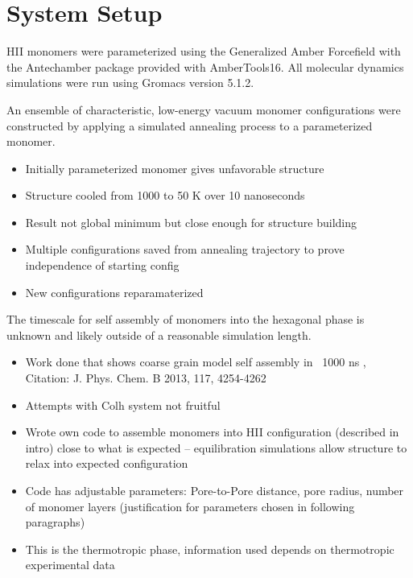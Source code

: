 \documentclass{article}
\begin{document}
	\section{System Setup}
	
	HII monomers were parameterized using the Generalized Amber Forcefield with the Antechamber package provided with AmberTools16. All molecular dynamics simulations were run using Gromacs version 5.1.2.

	An ensemble of characteristic, low-energy vacuum monomer configurations were constructed by applying a simulated annealing process to a parameterized monomer.
	\begin{itemize}
		\item Initially parameterized monomer gives unfavorable structure
		\item Structure cooled from 1000 to 50 K over 10 nanoseconds
		\item Result not global minimum but close enough for structure building
		\item Multiple configurations saved from annealing trajectory to prove independence of starting config
		\item New configurations reparamaterized
	\end{itemize}
	
	The timescale for self assembly of monomers into the hexagonal phase is unknown and likely outside of a reasonable simulation length. 
	\begin{itemize}
		\item Work done that shows coarse grain model self assembly in ~1000 ns , Citation: J. Phys. Chem. B 2013, 117, 4254-4262
		\item Attempts with Colh system not fruitful  %
		\item Wrote own code to assemble monomers into HII configuration (described in intro) close to what is expected -- equilibration simulations allow structure to relax into expected configuration 
		\item Code has adjustable parameters: Pore-to-Pore distance, pore radius, number of monomer layers (justification for parameters chosen in following paragraphs)
		\item This is the thermotropic phase, information used depends on thermotropic experimental data
	\end{itemize}
	
\end{document}
